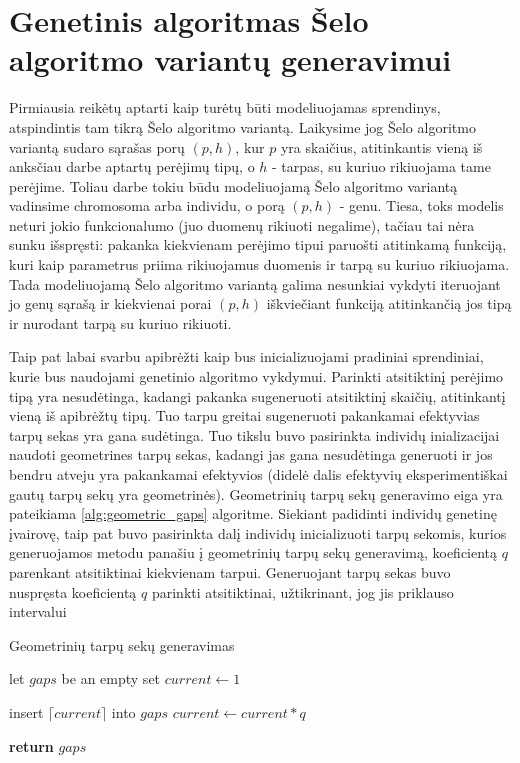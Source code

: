 \documentclass{VUMIFInfBakalaurinis}
\begin{document}
\section{Genetinis algoritmas Šelo algoritmo variantų generavimui}


Pirmiausia reikėtų aptarti kaip turėtų būti modeliuojamas sprendinys, atspindintis tam tikrą Šelo algoritmo variantą.
Laikysime jog Šelo algoritmo variantą sudaro sąrašas porų $(p, h)$, kur $p$ yra skaičius, atitinkantis vieną iš anksčiau darbe aptartų perėjimų tipų,
o $h$ - tarpas, su kuriuo rikiuojama tame perėjime.
Toliau darbe tokiu būdu modeliuojamą Šelo algoritmo variantą vadinsime chromosoma arba individu, o porą $(p, h)$ - genu.
Tiesa, toks modelis neturi jokio funkcionalumo (juo duomenų rikiuoti negalime), tačiau tai nėra sunku išspręsti: pakanka kiekvienam perėjimo tipui
paruošti atitinkamą funkciją, kuri kaip parametrus priima rikiuojamus duomenis ir tarpą su kuriuo rikiuojama.
Tada modeliuojamą Šelo algoritmo variantą galima nesunkiai vykdyti iteruojant jo genų sąrašą ir kiekvienai porai $(p, h)$ iškviečiant funkciją atitinkančią jos tipą ir nurodant tarpą su kuriuo rikiuoti.

Taip pat labai svarbu apibrėžti kaip bus inicializuojami pradiniai sprendiniai, kurie bus naudojami genetinio algoritmo vykdymui.
Parinkti atsitiktinį perėjimo tipą yra nesudėtinga, kadangi pakanka sugeneruoti atsitiktinį skaičių, atitinkantį vieną iš apibrėžtų tipų.
Tuo tarpu greitai sugeneruoti pakankamai efektyvias tarpų sekas yra gana sudėtinga.
Tuo tikslu buvo pasirinkta individų inializacijai naudoti geometrines tarpų sekas, kadangi jas gana nesudėtinga generuoti
ir jos bendru atveju yra pakankamai efektyvios (didelė dalis efektyvių eksperimentiškai gautų tarpų sekų yra geometrinės).
Geometrinių tarpų sekų generavimo eiga yra pateikiama \ref{alg:geometric_gaps} algoritme.
Siekiant padidinti individų genetinę įvairovę, taip pat buvo pasirinkta dalį individų inicializuoti
tarpų sekomis, kurios generuojamos metodu panašiu į geometrinių tarpų sekų generavimą, koeficientą $q$ parenkant atsitiktinai kiekvienam tarpui.
Generuojant tarpų sekas buvo nuspręsta koeficientą $q$ parinkti atsitiktinai, užtikrinant, jog jis priklauso intervalui 

\begin{algorithm}[H]
  \caption{Geometrinių tarpų sekų generavimas}\label{alg:geometric_gaps}
  \begin{algorithmic}[1]
      \State let $gaps$ be an empty set
      \State $current \gets 1$
      
        \State insert $\lceil current \rceil$ into $gaps$
        \State $current \gets current * q$ 
      \EndWhile

      \State \textbf{return} $gaps$
    \EndProcedure
  \end{algorithmic}
\end{algorithm}
\end{document}
